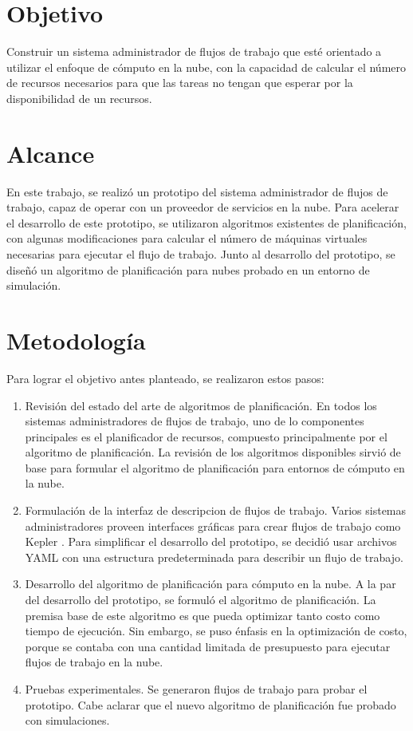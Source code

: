 \section{Objetivo}

Construir un sistema administrador de flujos de trabajo que esté orientado a utilizar el enfoque de cómputo en la nube, con la capacidad de calcular el n\'umero de recursos necesarios para que las tareas no tengan que esperar por la disponibilidad de un recursos.

\section{Alcance}

En este trabajo, se realiz\'o un prototipo del sistema administrador de flujos de trabajo, capaz de operar con un proveedor de servicios en la nube. Para acelerar el desarrollo de este prototipo, se utilizaron algoritmos existentes de planificaci\'on, con algunas modificaciones para calcular el n\'umero de m\'aquinas virtuales necesarias para ejecutar el flujo de trabajo. Junto al desarrollo del prototipo, se dise\~n\'o un algoritmo de planificaci\'on para nubes probado en un entorno de simulaci\'on.


\section{Metodolog\'ia}

Para lograr el objetivo antes planteado, se realizaron estos pasos:

\begin{enumerate}
\item Revisi\'on del estado del arte de algoritmos de planificaci\'on. En todos los sistemas administradores de flujos de trabajo, uno de lo componentes principales es el planificador de recursos, compuesto principalmente por el algoritmo de planificaci\'on. La revisi\'on de los algoritmos disponibles sirvi\'o de base para formular el algoritmo de planificaci\'on para entornos de c\'omputo en la nube.
\item Formulaci\'on de la interfaz de descripcion de flujos de trabajo. Varios sistemas administradores proveen interfaces gr\'aficas para crear flujos de trabajo como Kepler \cite{altintas2016kepler}. Para simplificar el desarrollo del prototipo, se decidi\'o usar archivos YAML con una estructura predeterminada para describir un flujo de trabajo.
\item Desarrollo del algoritmo de planificaci\'on para c\'omputo en la nube. A la par del desarrollo del prototipo, se formul\'o el algoritmo de planificaci\'on. La premisa base de este algoritmo es que pueda optimizar tanto costo como tiempo de ejecuci\'on. Sin embargo, se puso \'enfasis en la optimizaci\'on de costo, porque se contaba con una cantidad limitada de presupuesto para ejecutar flujos de trabajo en la nube. 
\item Pruebas experimentales. Se generaron flujos de trabajo para probar el prototipo. Cabe aclarar que el nuevo algoritmo de planificaci\'on fue probado con simulaciones.
\end{enumerate}

